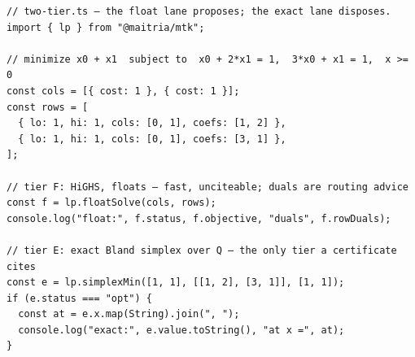 \begin{Verbatim}[fontsize=\small,frame=leftline,rulecolor=\color{accentmid},framesep=3mm,xleftmargin=3mm]
// two-tier.ts — the float lane proposes; the exact lane disposes.
import { lp } from "@maitria/mtk";

// minimize x0 + x1  subject to  x0 + 2*x1 = 1,  3*x0 + x1 = 1,  x >= 0
const cols = [{ cost: 1 }, { cost: 1 }];
const rows = [
  { lo: 1, hi: 1, cols: [0, 1], coefs: [1, 2] },
  { lo: 1, hi: 1, cols: [0, 1], coefs: [3, 1] },
];

// tier F: HiGHS, floats — fast, unciteable; duals are routing advice
const f = lp.floatSolve(cols, rows);
console.log("float:", f.status, f.objective, "duals", f.rowDuals);

// tier E: exact Bland simplex over Q — the only tier a certificate cites
const e = lp.simplexMin([1, 1], [[1, 2], [3, 1]], [1, 1]);
if (e.status === "opt") {
  const at = e.x.map(String).join(", ");
  console.log("exact:", e.value.toString(), "at x =", at);
}
\end{Verbatim}
